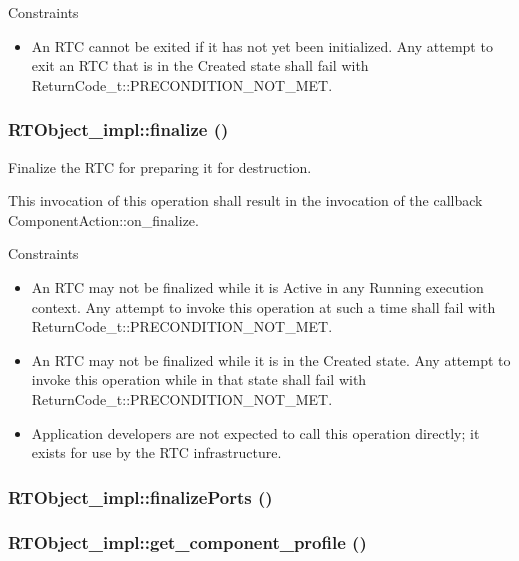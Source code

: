 Constraints\begin{itemize}
\item An RTC cannot be exited if it has not yet been initialized. Any attempt to exit an RTC that is in the Created state shall fail with Return\-Code\_\-t::PRECONDITION\_\-NOT\_\-MET.\end{itemize}
\subsubsection{\setlength{\rightskip}{0pt plus 5cm}RTObject\_\-impl::finalize ()}\label{classRTObject__impl_RTObject__impla14}


Finalize the RTC for preparing it for destruction. 

This invocation of this operation shall result in the invocation of the callback Component\-Action::on\_\-finalize.

Constraints\begin{itemize}
\item An RTC may not be finalized while it is Active in any Running execution context. Any attempt to invoke this operation at such a time shall fail with Return\-Code\_\-t::PRECONDITION\_\-NOT\_\-MET.\item An RTC may not be finalized while it is in the Created state. Any attempt to invoke this operation while in that state shall fail with Return\-Code\_\-t::PRECONDITION\_\-NOT\_\-MET.\item Application developers are not expected to call this operation directly; it exists for use by the RTC infrastructure.\end{itemize}
\subsubsection{\setlength{\rightskip}{0pt plus 5cm}RTObject\_\-impl::finalize\-Ports ()}\label{classRTObject__impl_RTObject__impla67}


\subsubsection{\setlength{\rightskip}{0pt plus 5cm}RTObject\_\-impl::get\_\-component\_\-profile ()}\label{classRTObject__impl_RTObject__impla19}


